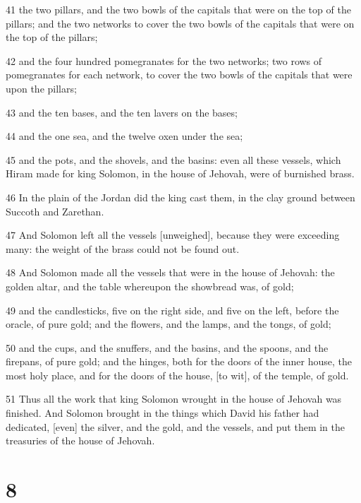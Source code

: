 \par 41 the two pillars, and the two bowls of the capitals that were on the top of the pillars; and the two networks to cover the two bowls of the capitals that were on the top of the pillars;
\par 42 and the four hundred pomegranates for the two networks; two rows of pomegranates for each network, to cover the two bowls of the capitals that were upon the pillars;
\par 43 and the ten bases, and the ten lavers on the bases;
\par 44 and the one sea, and the twelve oxen under the sea;
\par 45 and the pots, and the shovels, and the basins: even all these vessels, which Hiram made for king Solomon, in the house of Jehovah, were of burnished brass.
\par 46 In the plain of the Jordan did the king cast them, in the clay ground between Succoth and Zarethan.
\par 47 And Solomon left all the vessels [unweighed], because they were exceeding many: the weight of the brass could not be found out.
\par 48 And Solomon made all the vessels that were in the house of Jehovah: the golden altar, and the table whereupon the showbread was, of gold;
\par 49 and the candlesticks, five on the right side, and five on the left, before the oracle, of pure gold; and the flowers, and the lamps, and the tongs, of gold;
\par 50 and the cups, and the snuffers, and the basins, and the spoons, and the firepans, of pure gold; and the hinges, both for the doors of the inner house, the most holy place, and for the doors of the house, [to wit], of the temple, of gold.
\par 51 Thus all the work that king Solomon wrought in the house of Jehovah was finished. And Solomon brought in the things which David his father had dedicated, [even] the silver, and the gold, and the vessels, and put them in the treasuries of the house of Jehovah.

\chapter{8}

